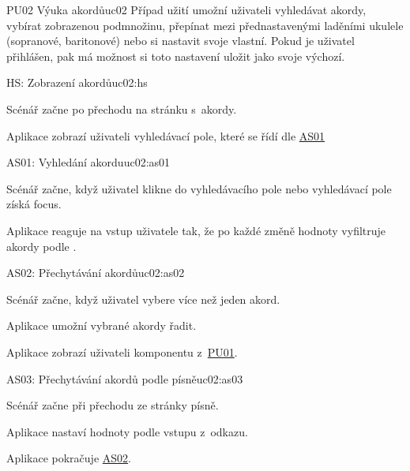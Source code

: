 \begin{usecase}{PU02 Výuka akordů}{uc02}
    Případ užití umožní uživateli vyhledávat akordy, vybírat zobrazenou podmnožinu, přepínat mezi přednastavenými laděními ukulele (sopranové, baritonové) nebo si nastavit svoje vlastní. Pokud je uživatel přihlášen, pak má možnost si toto nastavení uložit jako svoje výchozí.

    \begin{scenario}{HS: Zobrazení akordů}{uc02:hs}
        \item Scénář začne po přechodu na stránku s~akordy.
        \item Aplikace zobrazí uživateli vyhledávací pole, které se řídí dle \hyperref[uc02:as01]{AS01}
    \end{scenario}

    \begin{scenario}{AS01: Vyhledání akordu}{uc02:as01}
        \item Scénář začne, když uživatel klikne do vyhledávacího pole nebo vyhledávací pole získá focus.
        \item Aplikace reaguje na vstup uživatele tak, že po každé změně hodnoty vyfiltruje akordy podle .
    \end{scenario}

    \begin{scenario}{AS02: Přechytávání akordů}{uc02:as02}
        \item Scénář začne, když uživatel vybere více než jeden akord.
        \item Aplikace umožní vybrané akordy řadit.
        \item Aplikace zobrazí uživateli komponentu z~\hyperref[uc01]{PU01}.
    \end{scenario}

    \begin{scenario}{AS03: Přechytávání akordů podle písně}{uc02:as03}
        \item Scénář začne při přechodu ze stránky písně.
        \item Aplikace nastaví hodnoty podle vstupu z~odkazu.
        \item Aplikace pokračuje \hyperref[uc02:as02]{AS02}.
    \end{scenario}



\end{usecase}

